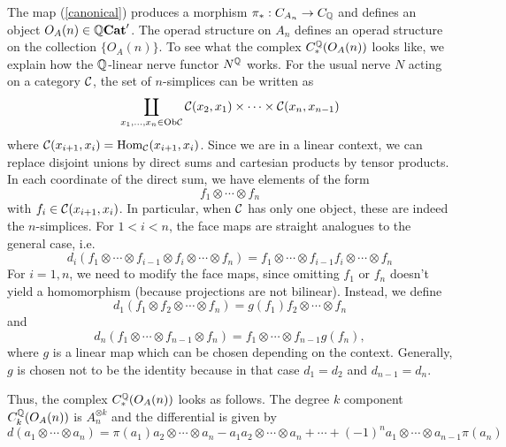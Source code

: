 \documentclass[TFM.tex]{subfiles}
\begin{document}
The map (\ref{canonical}) produces a morphism $\pi_*: C_{A_n}\to C_{\mathbb{Q}}$ and defines an object
$O_A(n)\in \mathbb{Q}\mathrm{\mathbf{Cat}}'$. The operad structure on $A_n$ defines an operad structure on the
collection $\{O_A(n)\}$. 
To see what the complex $C_*^{\mathbb{Q}}(O_A(n))$ looks like, we explain how the $\mathbb{Q}$-linear nerve functor $N^{\mathbb{Q}}$ works. For the usual nerve $N$ acting on a category $\mathcal{C}$, the set of $n$-simplices can be written as
\[
\coprod_{x_1,\dots, x_n\in\mathrm{Ob}\mathcal{C}}\mathcal{C}(x_2,x_1)\times\cdots \times\mathcal{C}(x_n,x_{n-1})
\]
where $\mathcal{C}(x_{i+1},x_i)=\operatorname{Hom}_{\mathcal{C}}(x_{i+1},x_i)$. Since we are in a linear context, we can replace disjoint unions by direct sums and cartesian products by tensor products. In each coordinate of the direct sum, we have elements of the form
\[
f_1\otimes\cdots \otimes f_n
\]
with $f_i\in \mathcal{C}(x_{i+1},x_i)$. In particular, when $\mathcal{C}$ has only one object, these are indeed the $n$-simplices. For $1<i<n$, the face maps are straight analogues to the general case, i.e. $$d_i(f_1\otimes\cdots \otimes f_{i-1}\otimes f_i\otimes \cdots\otimes f_n)=f_1\otimes\cdots \otimes f_{i-1}f_i\otimes\cdots \otimes f_n$$
For $i=1,n$, we need to modify the face maps, since omitting $f_1$ or $f_n$ doesn't yield a homomorphism (because projections are not bilinear). Instead, we define
\[
d_1(f_1\otimes f_2\otimes\cdots\otimes f_n)=g(f_1)f_2\otimes\cdots\otimes f_n
\]
and
\[
d_n(f_1\otimes\cdots\otimes f_{n-1}\otimes f_n)=f_1\otimes\cdots\otimes f_{n-1} g(f_n),
\]
where $g$ is a linear map which can be chosen depending on the context. Generally, $g$ is chosen not to be the identity because in that case $d_1=d_2$ and $d_{n-1}=d_n$. 

Thus, the complex $C_*^{\mathbb{Q}}(O_A(n))$ looks as follows. The degree $k$ component $C_k^{\mathbb{Q}}(O_A(n))$ is $A_n^{\otimes k}$ and the differential is given by %
\[
d(a_1\otimes\cdots\otimes a_n)=\pi(a_1)a_2\otimes\cdots\otimes a_n-a_1a_2\otimes \cdots\otimes a_n+\cdots+(-1)^{n}a_1\otimes\cdots\otimes a_{n-1}\pi(a_n)
\]
\end{document}
